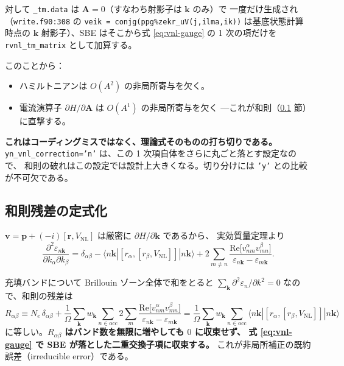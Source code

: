 \documentclass[dvipdfmx,a4paper,11pt]{jsarticle}
\newcommand{\file}[1]{\texttt{#1}}
\newcommand{\vk}{\bm{k}}
\newcommand{\vA}{\bm{A}}
\newcommand{\vp}{\bm{p}}
\newcommand{\vr}{\bm{r}}
\newcommand{\Real}{\mathrm{Re}}
\newcommand{\eps}{\varepsilon}
\begin{document}
対して \file{\_tm.data} は $\vA = 0$（すなわち射影子は $\vk$ のみ）で
一度だけ生成され（\file{write.f90:308} の \verb|veik = conjg(ppg%zekr_uV(j,ilma,ik))|
は基底状態計算時点の $\vk$ 射影子）、SBE はそこから式 \eqref{eq:vnl-gauge} の
1 次の項だけを \file{rvnl\_tm\_matrix} として加算する。

このことから：
\begin{itemize}
\item ハミルトニアンは $O(A^2)$ の非局所寄与を欠く。
\item 電流演算子 $\partial H/\partial \vA$ は $O(A^1)$ の非局所寄与を欠く
      ---これが和則（\ref{sec:vnl-sumrule} 節）に直撃する。
\end{itemize}

\textbf{これはコーディングミスではなく、理論式そのものの打ち切りである。}
\file{yn\_vnl\_correction='n'} は、この 1 次項自体をさらに丸ごと落とす設定なので、
和則の破れはこの設定では設計上大きくなる。切り分けには
\file{'y'} との比較が不可欠である。

\subsection{和則残差の定式化}
\label{sec:vnl-sumrule}

$\bm{v} = \vp + (-i)[\vr, V_{\mathrm{NL}}]$ は厳密に $\partial H/\partial \vk$ であるから、
実効質量定理より
%
\begin{equation}
  \frac{\partial^2 \eps_{n\vk}}{\partial k_\alpha \partial k_\beta}
  = \delta_{\alpha\beta}
  - \langle n\vk | [r_\alpha,[r_\beta,V_{\mathrm{NL}}]] | n\vk\rangle
  + 2\sum_{m \ne n} \frac{\Real\bigl[v^\alpha_{nm} v^\beta_{mn}\bigr]}{\eps_{n\vk} - \eps_{m\vk}}.
  \label{eq:effmass}
\end{equation}

充填バンドについて Brillouin ゾーン全体で和をとると
$\sum_{\vk} \partial^2\eps_n/\partial k^2 = 0$ なので、和則の残差は
%
\begin{equation}
  R_{\alpha\beta}
  \equiv N_e\,\delta_{\alpha\beta}
  + \frac{1}{\Omega}\sum_{\vk} w_{\vk} \sum_{n \in \mathrm{occ}}
    2\sum_{m} \frac{\Real\bigl[v^\alpha_{nm} v^\beta_{mn}\bigr]}{\eps_{n\vk} - \eps_{m\vk}}
  = \frac{1}{\Omega}\sum_{\vk} w_{\vk} \sum_{n \in \mathrm{occ}}
    \langle n\vk | [r_\alpha,[r_\beta,V_{\mathrm{NL}}]] | n\vk\rangle
  \label{eq:sumrule-residual}
\end{equation}
%
に等しい。\textbf{$R_{\alpha\beta}$ はバンド数を無限に増やしても $0$ に収束せず、
式 \eqref{eq:vnl-gauge} で SBE が落とした二重交換子項に収束する。}
これが非局所補正の既約誤差（irreducible error）である。
\end{document}
